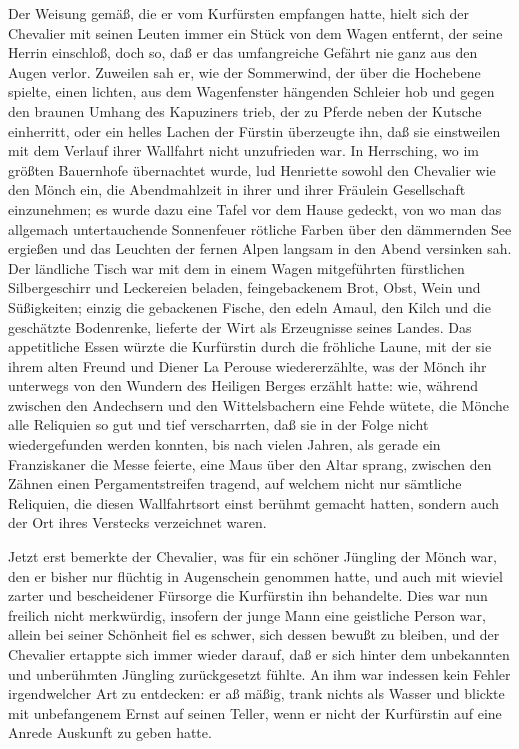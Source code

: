 Der Weisung gemäß, die er vom Kurfürsten empfangen hatte, hielt
sich der Chevalier mit seinen Leuten immer ein Stück von dem Wagen
entfernt, der seine Herrin einschloß, doch so, daß er das
umfangreiche Gefährt nie ganz aus den Augen verlor. Zuweilen sah
er, wie der Sommerwind, der über die Hochebene spielte, einen
lichten, aus dem Wagenfenster hängenden Schleier hob und gegen den
braunen Umhang des Kapuziners trieb, der zu Pferde neben der
\pagenum{[109]}Kutsche einherritt, oder ein helles Lachen der
Fürstin überzeugte ihn, daß sie einstweilen mit dem Verlauf ihrer
Wallfahrt nicht unzufrieden war. In Herrsching, wo im größten
Bauernhofe übernachtet wurde, lud Henriette sowohl den Chevalier
wie den Mönch ein, die Abendmahlzeit in ihrer und ihrer Fräulein
Gesellschaft einzunehmen; es wurde dazu eine Tafel vor dem Hause
gedeckt, von wo man das allgemach untertauchende Sonnenfeuer
rötliche Farben über den dämmernden See ergießen und das Leuchten
der fernen Alpen langsam in den Abend versinken sah. Der ländliche
Tisch war mit dem in einem Wagen mitgeführten fürstlichen
Silbergeschirr und Leckereien beladen, feingebackenem Brot, Obst,
Wein und Süßigkeiten; einzig die gebackenen Fische, den edeln
Amaul, den Kilch und die geschätzte Bodenrenke, lieferte der Wirt
als Erzeugnisse seines Landes. Das appetitliche Essen würzte die
Kurfürstin durch die fröhliche Laune, mit der sie ihrem alten
Freund und Diener La Perouse wiedererzählte, was der Mönch ihr
unterwegs von den Wundern des Heiligen Berges erzählt hatte: wie,
während zwischen den Andechsern und den Wittelsbachern eine Fehde
wütete, die Mönche alle Reliquien so gut und tief verscharrten, daß
sie in der Folge nicht wiedergefunden werden konnten, bis nach
vielen Jahren, als gerade ein Franziskaner die Messe feierte, eine
Maus über den Altar sprang, zwischen den Zähnen einen
Pergamentstreifen tragend, auf welchem nicht nur sämtliche
Reliquien, die diesen Wallfahrtsort einst berühmt gemacht hatten,
sondern auch der Ort ihres Verstecks verzeichnet waren.

Jetzt erst bemerkte der Chevalier, was für ein schöner Jüngling der
Mönch war, den er bisher nur flüchtig in Augenschein genommen
hatte, und auch mit wieviel zarter\pagenum{[110]} und bescheidener
Fürsorge die Kurfürstin ihn behandelte. Dies war nun freilich nicht
merkwürdig, insofern der junge Mann eine geistliche Person war,
allein bei seiner Schönheit fiel es schwer, sich dessen bewußt zu
bleiben, und der Chevalier ertappte sich immer wieder darauf, daß
er sich hinter dem unbekannten und unberühmten Jüngling
zurückgesetzt fühlte. An ihm war indessen kein Fehler irgendwelcher
Art zu entdecken: er aß mäßig, trank nichts als Wasser und blickte
mit unbefangenem Ernst auf seinen Teller, wenn er nicht der
Kurfürstin auf eine Anrede Auskunft zu geben hatte.

